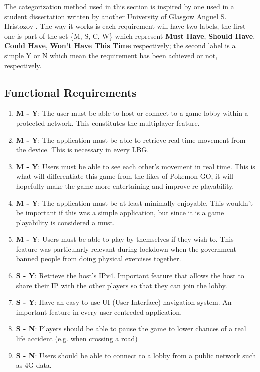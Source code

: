 \documentclass{dissertation}
\begin{document}
The categorization method used in this section is inspired by one used in a student dissertation written by another University of Glasgow Anguel S. Hristozov \citep{Anguel20}. The 
way it works is each requirement will have two labels, the first one is part of the set \{M, S, C, W\} which represent \textbf{Must Have}, \textbf{Should Have}, \textbf{Could Have}, 
\textbf{Won't Have This Time} respectively; the second label is a simple Y or N which mean the requirement has been achieved or not, respectively.

\subsection{Functional Requirements}

\begin{enumerate}
\item \textbf{M - Y}: The user must be able to host or connect to a game lobby within a protected network. This constitutes the multiplayer feature.
\item \textbf{M - Y}: The application must be able to retrieve real time movement from the device. This is necessary in every LBG.
\item \textbf{M - Y}: Users must be able to see each other's movement in real time. This is what will differentiate this game from the likes of Pokemon GO, it will hopefully make the 
game more entertaining and improve re-playability.
\item \textbf{M - Y}: The application must be at least minimally enjoyable. This wouldn't be important if this was a simple application, but since it is a game playability is considered a must.
\item \textbf{M - Y}: Users must be able to play by themselves if they wish to. This feature was particularly relevant during lockdown when the government banned people from doing 
physical exercises together.
\item \textbf{S - Y}: Retrieve the host's IPv4. Important feature that allows the host to share their IP with the other players so that they can join the lobby.
\item \textbf{S - Y}: Have an easy to use UI (User Interface) navigation system. An important feature in every user centreded application.
\item \textbf{S - N}: Players should be able to pause the game to lower chances of a real life accident (e.g. when crossing a road)
\item \textbf{S - N}: Users should be able to connect to a lobby from a public network such as 4G data.

\end{enumerate}
\end{document}
